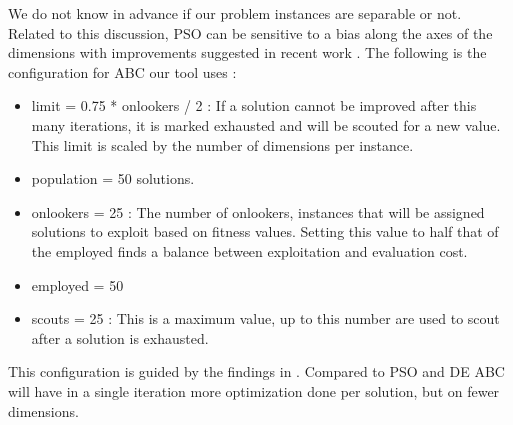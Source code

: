 We do not know in advance if our problem instances are separable or not. Related to this discussion, PSO can be sensitive to a bias along the axes of the dimensions \cite{PSOBias} with improvements suggested in recent work \cite{PSOBiasAlg}. The following is the configuration for ABC our tool uses : 
\begin{itemize}
\item limit = 0.75 * onlookers / 2 : If a solution cannot be improved after this many iterations, it is marked exhausted and will be scouted for a new value. This limit is scaled by the number of dimensions per instance. 
\item population = 50 solutions.
\item onlookers = 25 : The number of onlookers, instances that will be assigned solutions to exploit based on fitness values. Setting this value to half that of the employed finds a balance between exploitation and evaluation cost.
\item employed = 50 
\item scouts = 25 : This is a maximum value, up to this number are used to scout after a solution is exhausted. 
\end{itemize}
This configuration is guided by the findings in \cite{ABC}. Compared to PSO and DE ABC will have in a single iteration more optimization done per solution, but on fewer dimensions.
